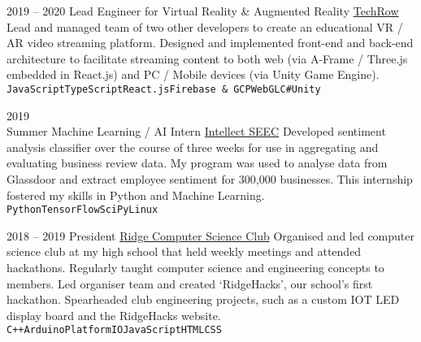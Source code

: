 \documentclass[9pt]{developercv} %
\begin{document}
\vspace{1em}

\begin{center}
\end{center}

\pagebreak
{}

\begin{entrylist}
	\entry
	{2019 -- 2020}
	{Lead Engineer for Virtual Reality \& Augmented Reality}
	{\href{https://www.techrow.org}{TechRow}}
	{
		Lead and managed team of two other developers to create an educational VR / AR video streaming platform.
		Designed and implemented front-end and back-end architecture to facilitate streaming content to both web (via A-Frame / Three.js embedded in React.js) and PC / Mobile devices (via Unity Game Engine).
		\\
		\texttt{JavaScript}\slashsep\texttt{TypeScript}\slashsep\texttt{React.js}\slashsep\texttt{Firebase \& GCP}\slashsep\texttt{WebGL}\slashsep\texttt{C\#}\slashsep\texttt{Unity}
	}

	\entry
	{
		2019
		\\
		\footnotesize{Summer}
	}
	{Machine Learning / AI Intern}
	{\href{https://intellectseec.com}{Intellect SEEC}}
	{
		Developed sentiment analysis classifier over the course of three
		weeks for use in aggregating and evaluating business review data.
		My program was used to analyse data from Glassdoor and extract
		employee sentiment for 300,000 businesses. This internship fostered my skills in
		Python and Machine Learning.
		\\ \texttt{Python}\slashsep\texttt{TensorFlow}\slashsep\texttt{SciPy}\slashsep\texttt{Linux}
	}

	\entry
	{2018 -- 2019}
	{President}
	{\href{https://ridgecompsci.club}{Ridge Computer Science Club}}
	{
		Organised and led computer science club at my high school that held weekly meetings and attended hackathons.
		Regularly taught computer science and engineering concepts to members.
		Led organiser team and created ‘RidgeHacks’, our school’s first hackathon.
		Spearheaded club engineering projects, such as a custom IOT LED display board and the RidgeHacks website.
		\\
		\texttt{C++}\slashsep\texttt{Arduino}\slashsep\texttt{PlatformIO}\slashsep\texttt{JavaScript}\slashsep\texttt{HTML}\slashsep\texttt{CSS}
	}


\end{entrylist}
\end{document}
